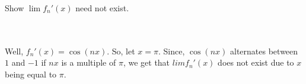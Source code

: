 Show $\lim f_n'(x)$ need not exist.\\\\

\begin{solution}\renewcommand{\qedsymbol}{}\ \\
    Well, $f_n'(x)=\cos(nx)$. So, let $x=\pi$. Since, $\cos(nx)$ alternates between $1$ and $-1$ if $nx$
    is a multiple of $\pi$, we get that $lim f_n'(x)$ does not exist due to $x$ being equal to $\pi$.

\end{solution}